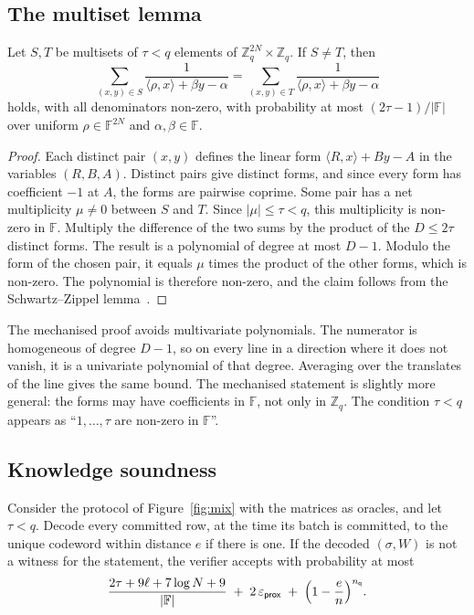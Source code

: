 \documentclass[sigconf,anonymous]{acmart}
\newcommand{\Zq}{\mathbb{Z}_q}
\newcommand{\F}{\mathbb{F}}
\newcommand{\ip}[2]{\langle #1, #2\rangle}
\newcommand{\epsprox}{\varepsilon_{\mathsf{prox}}}
\newcommand{\nq}{n_{\mathsf{q}}}
\begin{document}
\subsection{The multiset lemma}

\begin{lemma}\label{lem:logder}
Let $S,T$ be multisets of $\tau<q$ elements of $\Zq^{2N}\times\Zq$. If $S\ne T$, then
\[
  \sum_{(x,y)\in S}\frac{1}{\ip{\rho}{x}+\beta y-\alpha}
  =\sum_{(x,y)\in T}\frac{1}{\ip{\rho}{x}+\beta y-\alpha}
\]
holds, with all denominators non-zero, with probability at most $(2\tau-1)/|\F|$ over uniform
$\rho\in\F^{2N}$ and $\alpha,\beta\in\F$.
\end{lemma}
\begin{proof}
Each distinct pair $(x,y)$ defines the linear form $\ip{R}{x}+By-A$ in the variables $(R,B,A)$.
Distinct pairs give distinct forms, and since every form has coefficient $-1$ at $A$, the forms are
pairwise coprime. Some pair has a net multiplicity $\mu\ne 0$ between $S$ and $T$. Since
$|\mu|\le\tau<q$, this multiplicity is non-zero in $\F$. Multiply the difference of the two sums by
the product of the $D\le 2\tau$ distinct forms. The result is a polynomial of degree at most $D-1$.
Modulo the form of the chosen pair, it equals $\mu$ times the product of the other forms, which is
non-zero. The polynomial is therefore non-zero, and the claim follows from the Schwartz--Zippel
lemma~\cite{Schwartz80,Zippel79}.
\end{proof}

The mechanised proof avoids multivariate polynomials. The numerator is homogeneous of degree
$D-1$, so on every line in a direction where it does not vanish, it is a univariate polynomial of
that degree. Averaging over the translates of the line gives the same bound. The mechanised
statement is slightly more general: the forms may have coefficients in $\F$, not only in $\Zq$. The
condition $\tau<q$ appears as ``$1,\dots,\tau$ are non-zero in $\F$''.

\subsection{Knowledge soundness}

\begin{theorem}\label{thm:sound}
Consider the protocol of Figure~\ref{fig:mix} with the matrices as oracles, and let $\tau<q$.
Decode every committed row, at the time its batch is committed, to the unique codeword within
distance $e$ if there is one. If the decoded $(\sigma,W)$ is not a witness for the statement, the
verifier accepts with probability at most
\[
  \frac{2\tau+9\ell+7\log N+9}{|\F|}\;+\;2\,\epsprox\;+\;\Bigl(1-\frac{e}{n}\Bigr)^{\nq}.
\]
\end{theorem}
\end{document}
